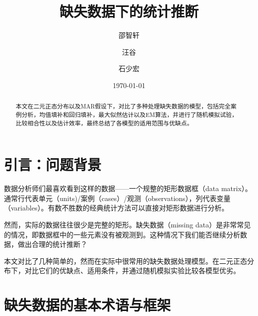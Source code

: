 \documentclass[aps,pre,12pt,preprint,onecolumn,showpacs,showkeys,AutoFakeBold]{revtex4-1}
\begin{document}
\title{\bf\heiti{} 缺失数据下的统计推断 \vspace{15mm}}
\author{\fangsong{}邵智轩\vspace{2mm}}
\author{\fangsong{}汪谷\vspace{2mm}}
\date{\today}
\author{\fangsong{}石少宏\vspace{2mm}}

\begin{abstract}
\vspace{10mm}
\begin{spacing}{1.5}
\songti{}
本文在二元正态分布以及MAR假设下，对比了多种处理缺失数据的模型，包括完全案例分析，均值填补和回归填补，最大似然估计以及EM算法，并进行了随机模拟试验，比较相合性以及估计效率，最终总结了各模型的适用范围与优缺点。
\end{spacing}
\end{abstract}
\maketitle

\tableofcontents
\newpage
\songti{}

\section{引言：问题背景}
    数据分析师们最喜欢看到这样的数据——一个规整的矩形数据框（data matrix）。通常行代表单元（units)/案例（cases）/观测（observations），列代表变量（variables）。有数不胜数的经典统计方法可以直接对矩形数据进行分析。

    然而，实际的数据往往很少是完整的矩形。缺失数据（missing data）是非常常见的情况，即数据框中的一些元素没有被观测到。这种情况下我们能否继续分析数据，做出合理的统计推断？

    本文对比了几种简单的，然而在实际中很常用的缺失数据处理模型。在二元正态分布下，对比它们的优缺点、适用条件，并通过随机模拟实验比较各模型优劣。

\section{缺失数据的基本术语与框架}
\end{document}
